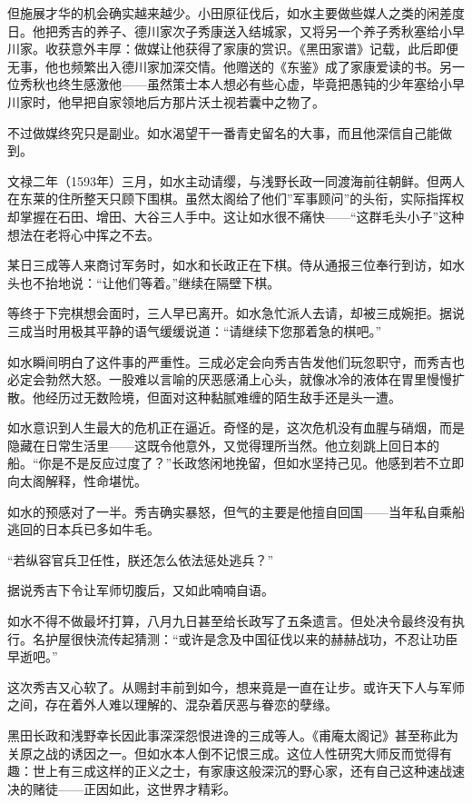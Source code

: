 \documentclass[
]{book}
\begin{document}
但施展才华的机会确实越来越少。小田原征伐后，如水主要做些媒人之类的闲差度日。他把秀吉的养子、德川家次子秀康送入结城家，又将另一个养子秀秋塞给小早川家。收获意外丰厚：做媒让他获得了家康的赏识。《黑田家谱》记载，此后即便无事，他也频繁出入德川家加深交情。他赠送的《东鉴》成了家康爱读的书。另一位秀秋也终生感激他------虽然策士本人想必有些心虚，毕竟把愚钝的少年塞给小早川家时，他早把自家领地后方那片沃土视若囊中之物了。

不过做媒终究只是副业。如水渴望干一番青史留名的大事，而且他深信自己能做到。

文禄二年（1593年）三月，如水主动请缨，与浅野长政一同渡海前往朝鲜。但两人在东莱的住所整天只顾下围棋。虽然太阁给了他们''军事顾问''的头衔，实际指挥权却掌握在石田、增田、大谷三人手中。这让如水很不痛快------``这群毛头小子''这种想法在老将心中挥之不去。

某日三成等人来商讨军务时，如水和长政正在下棋。侍从通报三位奉行到访，如水头也不抬地说：``让他们等着。''继续在隔壁下棋。

等终于下完棋想会面时，三人早已离开。如水急忙派人去请，却被三成婉拒。据说三成当时用极其平静的语气缓缓说道：``请继续下您那着急的棋吧。''

如水瞬间明白了这件事的严重性。三成必定会向秀吉告发他们玩忽职守，而秀吉也必定会勃然大怒。一股难以言喻的厌恶感涌上心头，就像冰冷的液体在胃里慢慢扩散。他经历过无数险境，但面对这种黏腻难缠的陌生敌手还是头一遭。

如水意识到人生最大的危机正在逼近。奇怪的是，这次危机没有血腥与硝烟，而是隐藏在日常生活里------这既令他意外，又觉得理所当然。他立刻跳上回日本的船。``你是不是反应过度了？''长政悠闲地挽留，但如水坚持己见。他感到若不立即向太阁解释，性命堪忧。

如水的预感对了一半。秀吉确实暴怒，但气的主要是他擅自回国------当年私自乘船逃回的日本兵已多如牛毛。

``若纵容官兵卫任性，朕还怎么依法惩处逃兵？''

据说秀吉下令让军师切腹后，又如此喃喃自语。

如水不得不做最坏打算，八月九日甚至给长政写了五条遗言。但处决令最终没有执行。名护屋很快流传起猜测：``或许是念及中国征伐以来的赫赫战功，不忍让功臣早逝吧。''

这次秀吉又心软了。从赐封丰前到如今，想来竟是一直在让步。或许天下人与军师之间，存在着外人难以理解的、混杂着厌恶与眷恋的孽缘。

黑田长政和浅野幸长因此事深深怨恨进谗的三成等人。《甫庵太阁记》甚至称此为关原之战的诱因之一。但如水本人倒不记恨三成。这位人性研究大师反而觉得有趣：世上有三成这样的正义之士，有家康这般深沉的野心家，还有自己这种速战速决的赌徒------正因如此，这世界才精彩。
\end{document}
